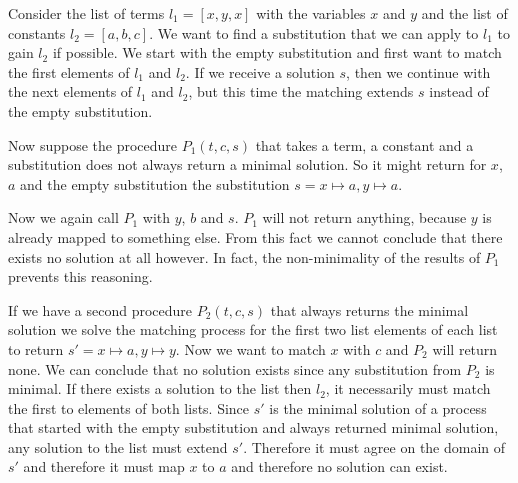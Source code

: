 \begin{example}
    Consider the list of terms $l_1 = [x, y, x]$ with the variables $x$ and $y$ and the list of constants $l_2 = [a,b, c]$. We want to find a substitution that we can apply to $l_1$ to gain $l_2$ if possible. We start with the empty substitution and first want to match the first elements of $l_1$ and $l_2$. If we receive a solution $s$, then we continue with the next elements of $l_1$ and $l_2$, but this time the matching extends $s$ instead of the empty substitution.

    Now suppose the procedure $P_1(t,c, s)$ that takes a term, a constant and a substitution does not always return a minimal solution. So it might return for $x$, $a$ and the empty substitution the substitution $s = x \mapsto a, y\mapsto a$.

    Now we again call $P_1$ with $y$, $b$ and $s$. $P_1$ will not return anything, because $y$ is already mapped to something else. From this fact we cannot conclude that there exists no solution at all however. In fact, the non-minimality of the results of $P_1$ prevents this reasoning.

    If we have a second procedure $P_2(t,c, s)$ that always returns the minimal solution we solve the matching process for the first two list elements of each list to return $s' = x \mapsto a, y \mapsto y$. Now we want to match $x$ with $c$ and $P_2$ will return none. We can conclude that no solution exists since any substitution from $P_2$ is minimal. If there exists a solution to the list then $l_2$, it necessarily must match the first to elements of both lists. Since $s'$ is the minimal solution of a process that started with the empty substitution and always returned minimal solution, any solution to the list must extend $s'$. Therefore it must agree on the domain of $s'$ and therefore it must map $x$ to $a$ and therefore no solution can exist.

\end{example}

